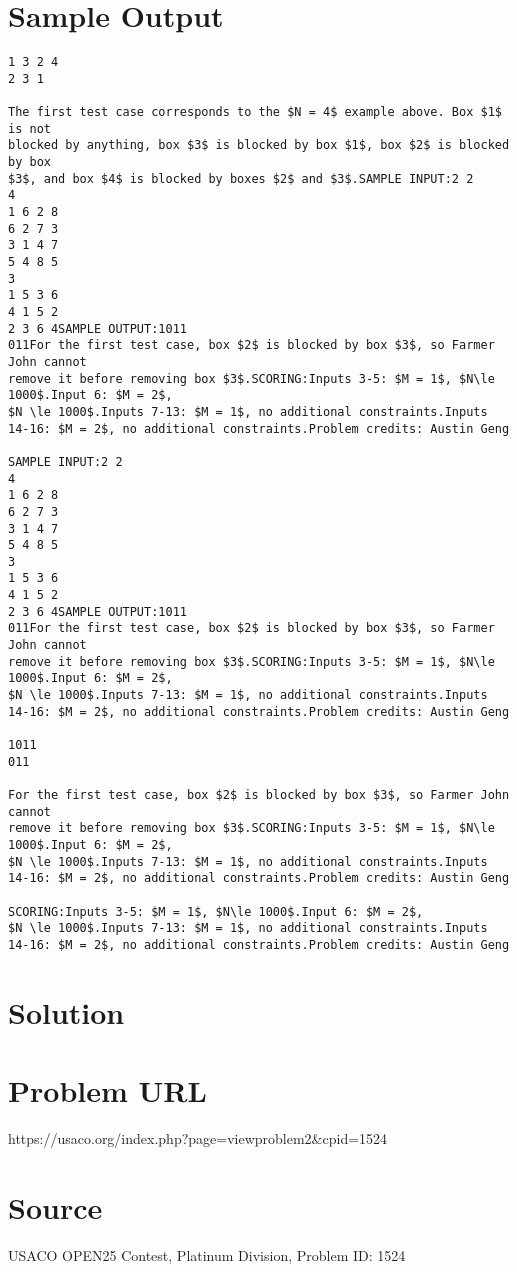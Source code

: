 \documentclass[12pt]{article}
\begin{document}
\section*{Sample Output}
\begin{verbatim}
1 3 2 4
2 3 1

The first test case corresponds to the $N = 4$ example above. Box $1$ is not
blocked by anything, box $3$ is blocked by box $1$, box $2$ is blocked by box
$3$, and box $4$ is blocked by boxes $2$ and $3$.SAMPLE INPUT:2 2
4
1 6 2 8
6 2 7 3
3 1 4 7
5 4 8 5
3
1 5 3 6
4 1 5 2
2 3 6 4SAMPLE OUTPUT:1011
011For the first test case, box $2$ is blocked by box $3$, so Farmer John cannot
remove it before removing box $3$.SCORING:Inputs 3-5: $M = 1$, $N\le 1000$.Input 6: $M = 2$,
$N \le 1000$.Inputs 7-13: $M = 1$, no additional constraints.Inputs 14-16: $M = 2$, no additional constraints.Problem credits: Austin Geng

SAMPLE INPUT:2 2
4
1 6 2 8
6 2 7 3
3 1 4 7
5 4 8 5
3
1 5 3 6
4 1 5 2
2 3 6 4SAMPLE OUTPUT:1011
011For the first test case, box $2$ is blocked by box $3$, so Farmer John cannot
remove it before removing box $3$.SCORING:Inputs 3-5: $M = 1$, $N\le 1000$.Input 6: $M = 2$,
$N \le 1000$.Inputs 7-13: $M = 1$, no additional constraints.Inputs 14-16: $M = 2$, no additional constraints.Problem credits: Austin Geng

1011
011

For the first test case, box $2$ is blocked by box $3$, so Farmer John cannot
remove it before removing box $3$.SCORING:Inputs 3-5: $M = 1$, $N\le 1000$.Input 6: $M = 2$,
$N \le 1000$.Inputs 7-13: $M = 1$, no additional constraints.Inputs 14-16: $M = 2$, no additional constraints.Problem credits: Austin Geng

SCORING:Inputs 3-5: $M = 1$, $N\le 1000$.Input 6: $M = 2$,
$N \le 1000$.Inputs 7-13: $M = 1$, no additional constraints.Inputs 14-16: $M = 2$, no additional constraints.Problem credits: Austin Geng
\end{verbatim}

\section*{Solution}


\section*{Problem URL}
https://usaco.org/index.php?page=viewproblem2&cpid=1524

\section*{Source}
USACO OPEN25 Contest, Platinum Division, Problem ID: 1524
\end{document}
